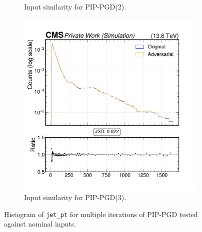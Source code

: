 \begin{figure}[h]
\begin{subfigure}[t]{0.32\textwidth}
    \caption*{Input similarity for PIP-PGD(2).}
  \end{subfigure}\hfill
  \begin{subfigure}[t]{0.32\textwidth}
    \includegraphics[width=\linewidth]{media/output/features/compare/combined_it_3/cmp_global_features_jet_pt.pdf}
    \caption*{Input similarity for PIP-PGD(3).}
  \end{subfigure}

  \caption*{Histogram of \texttt{jet\_pt} for multiple iterations of PIP-PGD tested against nominal inputs.}
  \label{fig:combined_input_jet_pt}
\end{figure}

